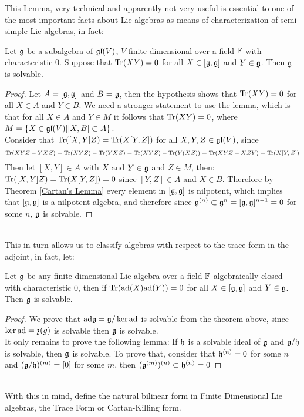 This Lemma, very technical and apparently not very useful is essential to one of the most important facts about Lie algebras as means of characterization of semi-simple Lie algebras, in fact:
\begin{teo}
	Let $\mathfrak{g}$ be a subalgebra of $\mathfrak{gl}(V)$, $V$ finite dimensional over a field $\mathbb{F}$ with characteristic $0$. Suppose that $\text{Tr}(XY)=0$ for all $X \in [\mathfrak{g},\mathfrak{g}]$ and $Y \in \mathfrak{g}$. Then $\mathfrak{g}$ is solvable.
	\label{Cartan's Criterion}
\end{teo}
\begin{proof}
	Let $A=[\mathfrak{g},\mathfrak{g}]$ and $B=\mathfrak{g}$, then the hypothesis shows that $\text{Tr}(XY)=0$ for all $X \in A$ and $Y \in B$. We need a stronger statement to use the lemma, which is that for all $X \in A$ and $Y \in M$ it follows that $\text{Tr}(XY)=0$, where $M=\{X \in \mathfrak{gl}(V)| [X,B]\subset A\}$.\\
	Consider that $\text{Tr}([X,Y]Z)=\text{Tr}(X[Y,Z])$ for all $X,Y,Z \in \mathfrak{gl}(V)$, since $$\text{Tr}(XYZ - YXZ) = \text{Tr}(XYZ)-\text{Tr}(YXZ) = \text{Tr}(XYZ)-\text{Tr}(Y(XZ)) = \text{Tr}(XYZ-XZY) = \text{Tr}(X[Y,Z])$$
	Then let $[X,Y] \in A$ with $X$ and $Y \in \mathfrak{g}$ and $Z \in M$, then:$\text{Tr}([X,Y]Z)=\text{Tr}(X[Y,Z])=0$ since $[Y,Z] \in A$ and $X \in B$. Therefore by Theorem \ref{Cartan's Lemma} every element in $[\mathfrak{g},\mathfrak{g}]$ is nilpotent, which implies that $[\mathfrak{g},\mathfrak{g}]$ is a nilpotent algebra, and therefore since $\mathfrak{g}^{(n)}\subset \mathfrak{g}^n = [\mathfrak{g},\mathfrak{g}]^{n-1}=0$ for some $n$, $\mathfrak{g}$ is solvable.
\end{proof}\\
This in turn allows us to classify algebras with respect to the trace form in the adjoint, in fact, let:
\begin{corol}
	Let $\mathfrak{g}$ be any finite dimensional Lie algebra over a field $\mathbb{F}$ algebraically closed with characteristic $0$, then if $\text{Tr}(\text{ad}(X) \text{ad}(Y))=0$ for all $X \in [\mathfrak{g},\mathfrak{g}]$ and $Y \in \mathfrak{g}$. Then $\mathfrak{g}$ is solvable.
	\label{Corollary}
\end{corol}
\begin{proof}
	We prove that $\text{ad} \mathfrak{g} = \mathfrak{g}/\ker \text{ad}$ is solvable from the theorem above, since $\ker \text{ad} = \mathfrak{z}(g)$ is solvable then $\mathfrak{g}$ is solvable.\\
	It only remains to prove the following lemma: If $\mathfrak{h}$ is a solvable ideal of $\mathfrak{g}$ and $\mathfrak{g}/\mathfrak{h}$ is solvable, then $\mathfrak{g}$ is solvable. To prove that, consider that $\mathfrak{h}^{(n)} = 0$ for some $n$ and $(\mathfrak{g}/\mathfrak{h})^{(m)} = [0]$ for some $m$, then $(\mathfrak{g}^{(m)})^{(n)} \subset \mathfrak{h}^{(n)} = 0$
\end{proof}\\
With this in mind, define the natural bilinear form in Finite Dimensional Lie algebras, the Trace Form or Cartan-Killing form.
